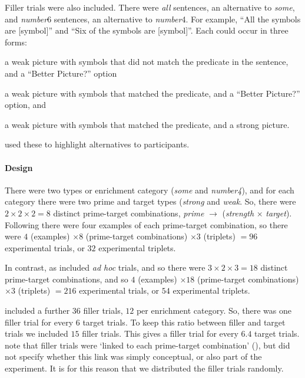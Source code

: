 \documentclass[10pt]{article}
\begin{document}
\begin{multicols}{2}
Filler trials were also included.
There were \emph{all} sentences, an alternative to \emph{some}, and \emph{number}6 sentences, an alternative to \emph{number}4.
For example, ``All the symbols are [symbol]'' and ``Six of the symbols are [symbol]''.
Each could occur in three forms:
\begin{enumerate*}[label=(\arabic*)]
\item a weak picture with symbols that did not match the predicate in the sentence, and a ``Better Picture?'' option
\item a weak picture with symbols that matched the predicate, and a ``Better Picture?'' option, and
\item a weak picture with symbols that matched the predicate, and a strong picture.
\end{enumerate*}
\citeauthor{Bott:2016aa} used these to highlight alternatives to participants.

\paragraph{Design}
There were two types or enrichment category (\emph{some} and \emph{number4}), and for each category there were two prime and target types (\emph{strong} and \emph{weak}.
So, there were \(2 \times 2 \times 2 = 8\) distinct prime-target combinations, \emph{prime} \(\rightarrow\) (\emph{strength} \(\times\) \emph{target}).
Following \citeauthor{Bott:2016aa} there were four examples of each prime-target combination, so there were \(4\) (examples) \(\times 8\) (prime-target combinations) \(\times 3\) (triplets) \(= 96\) experimental trials, or \(32\) experimental triplets.

In contrast, as \citeauthor{Bott:2016aa} included \emph{ad hoc} trials, and so there were \(3 \times 2 \times 3 = 18\) distinct prime-target combinations, and so  \(4\) (examples) \(\times 18\) (prime-target combinations) \(\times 3\) (triplets) \(= 216\) experimental trials, or \(54\) experimental triplets.

\citeauthor{Bott:2016aa} included a further \(36\) filler trials, \(12\) per enrichment category.
So, there was one filler trial for every \(6\) target trials.
To keep this ratio between filler and target trials we included \(15\) filler trials.
This gives a filler trial for every \(6.4\) target trials.
\citeauthor{Bott:2016aa} note that filler trials were `linked to each prime-target combination' (\citeyear[123]{Bott:2016aa}), but did not specify whether this link was simply conceptual, or also part of the experiment.
It is for this reason that we distributed the filler trials randomly.


\end{multicols}
\end{document}
